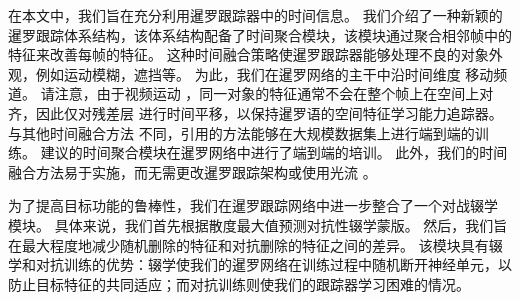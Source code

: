 在本文中，我们旨在充分利用暹罗跟踪器中的时间信息。
我们介绍了一种新颖的暹罗跟踪体系结构，该体系结构配备了时间聚合模块，该模块通过聚合相邻帧中的特征来改善每帧的特征。
这种时间融合策略使暹罗跟踪器能够处理不良的对象外观，例如运动模糊，遮挡等。
为此，我们在暹罗网络的主干中沿时间维度 \cite{lin2019tsm} 移动频道。
请注意，由于视频运动 \cite{zhu2017flow}，同一对象的特征通常不会在整个帧上在空间上对齐，因此仅对残差层 \cite{lin2019tsm} 进行时间平移，以保持暹罗语的空间特征学习能力追踪器。
与其他时间融合方法 \cite{tao2016siamese, gladh2016deep}不同，引用的方法能够在大规模数据集上进行端到端的训练。
建议的时间聚合模块在暹罗网络中进行了端到端的培训。
此外，我们的时间融合方法易于实施，而无需更改暹罗跟踪架构或使用光流 \cite{zhu2018end}。

为了提高目标功能的鲁棒性，我们在暹罗跟踪网络中进一步整合了一个对战辍学 \cite{park2018adversarial} 模块。
具体来说，我们首先根据散度最大值预测对抗性辍学蒙版。
然后，我们旨在最大程度地减少随机删除的特征和对抗删除的特征之间的差异。
该模块具有辍学和对抗训练的优势：辍学使我们的暹罗网络在训练过程中随机断开神经单元，以防止目标特征的共同适应；而对抗训练则使我们的跟踪器学习困难的情况。

